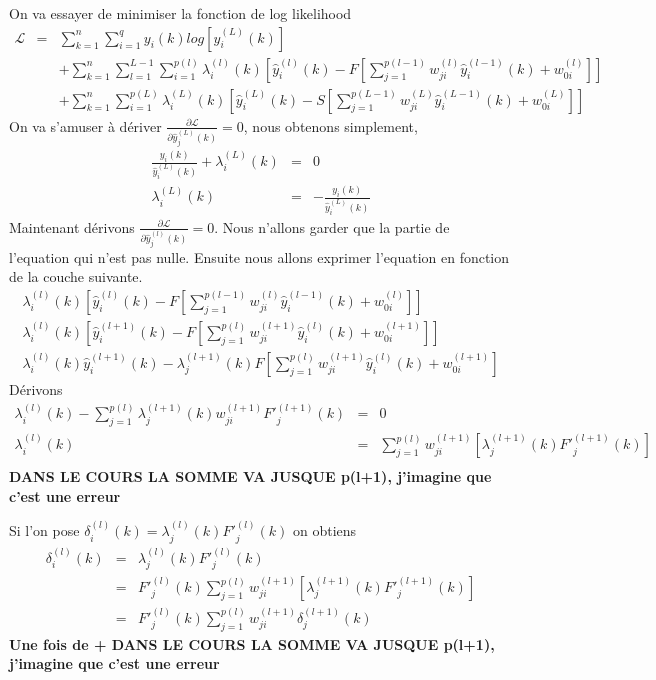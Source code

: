 \documentclass[a4paper, 11pt, onecolumn]{article}
\begin{document}
\begin{enumerate}
\begin{framed}
On va essayer de minimiser la fonction de log likelihood
\begin{eqnarray}
\mathcal{L} &=& \sum_{k=1}^n \sum_{i=1}^q y_i(k) log\left[\widehat{y}_i^{(L)}(k)\right]\\
&& +\sum_{k=1}^n\sum_{l=1}^{L-1}\sum_{i=1}^{p(l)}\lambda_i^{(l)}(k)\left[\widehat{y}_i^{(l)}(k) - F[\sum_{j=1}^{p(l-1)}w_{ji}^{(l)}\widehat{y}_i^{(l-1)}(k)+w_{0i}^{(l)}]\right]\\
&& +\sum_{k=1}^n\sum_{i=1}^{p(L)}\lambda_i^{(L)}(k) \left[\widehat{y}_i^{(L)}(k)-S[\sum_{j=1}^{p(L-1)}w_{ji}^{(L)}\widehat{y}_i^{(L-1)}(k)+w_{0i}^{(L)}]\right]
\end{eqnarray}
On va s'amuser à dériver $\frac{\partial \mathcal{L}}{\partial \widehat{y}_j^{(L)}(k)}=0$, nous obtenons simplement,
\begin{eqnarray}
\frac{y_i(k)}{\widehat y_i^{(L)}(k)}+\lambda_i^{(L)}(k) &=& 0 \\
\lambda_i^{(L)}(k) &=& -\frac{y_i(k)}{\widehat y_i^{(L)}(k)}
\end{eqnarray}
Maintenant dérivons $\frac{\partial \mathcal{L}}{\partial \widehat{y}_j^{(l)}(k)}=0$. Nous n'allons garder que la partie de l'equation qui n'est pas nulle. Ensuite nous allons exprimer l'equation en fonction de la couche suivante.
\begin{eqnarray}
\lambda_i^{(l)}(k)\left[\widehat{y}_i^{(l)}(k) - F[\sum_{j=1}^{p(l-1)}w_{ji}^{(l)}\widehat{y}_i^{(l-1)}(k)+w_{0i}^{(l)}]\right]\\
\lambda_i^{(l)}(k)\left[\widehat{y}_i^{(l+1)}(k) - F[\sum_{j=1}^{p(l)}w_{ji}^{(l+1)}\widehat{y}_i^{(l)}(k)+w_{0i}^{(l+1)}]\right]\\
\lambda_i^{(l)}(k)\widehat{y}_i^{(l+1)}(k) - \lambda_j^{(l+1)}(k)F[\sum_{j=1}^{p(l)}w_{ji}^{(l+1)}\widehat{y}_i^{(l)}(k)+w_{0i}^{(l+1)}]
\end{eqnarray}
Dérivons
\begin{eqnarray}
\lambda_i^{(l)}(k)- \sum_{j=1}^{p(l)} \lambda_j^{(l+1)}(k)w_{ji}^{(l+1)}{F'}_j^{(l+1)}(k)&=& 0\\
\lambda_i^{(l)}(k)&=& \sum_{j=1}^{p(l)} w_{ji}^{(l+1)}[\lambda_j^{(l+1)}(k){F'}_j^{(l+1)}(k)]\\
\end{eqnarray}
\textbf{DANS LE COURS LA SOMME VA JUSQUE p(l+1), j'imagine que c'est une erreur}

Si l'on pose $\delta_i^{(l)}(k) = \lambda_j^{(l)}(k){F'}_j^{(l)}(k)$ on obtiens
\begin{eqnarray}
\delta_i^{(l)}(k) &=&\lambda_j^{(l)}(k){F'}_j^{(l)}(k) \\
&=& {F'}_j^{(l)}(k)\sum_{j=1}^{p(l)} w_{ji}^{(l+1)}[\lambda_j^{(l+1)}(k){F'}_j^{(l+1)}(k)]\\
&=& {F'}_j^{(l)}(k)\sum_{j=1}^{p(l)} w_{ji}^{(l+1)}\delta_j^{(l+1)}(k)
\end{eqnarray}
\textbf{Une fois de + DANS LE COURS LA SOMME VA JUSQUE p(l+1), j'imagine que c'est une erreur}


\end{framed}
\end{enumerate}
\end{document}
